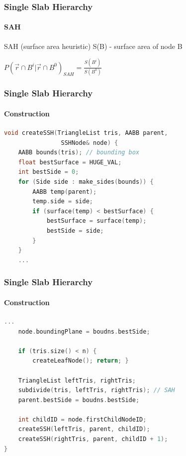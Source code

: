 \documentclass{beamer}
\begin{document}
\begin{frame}
    \frametitle{Single Slab Hierarchy}
    \framesubtitle{SAH}
    \begin{block}{SAH (surface area heuristic)}
        S(B) - surface area of node B

        \(
        P(\overrightarrow{r}\cap B^i \lvert \overrightarrow{r} \cap B^0)_{SAH} = \frac{S(B^i)}{S(B^0)}
        \)
    \end{block}

\end{frame}

\begin{frame}[fragile]
    \frametitle{Single Slab Hierarchy}
    \framesubtitle{Construction}

    \begin{lstlisting}[language=C++,basicstyle=\ttfamily,keywordstyle=\color{red}]
void createSSH(TriangleList tris, AABB parent,
                SSHNode& node) {
    AABB bounds(tris); // bounding box
    float bestSurface = HUGE_VAL;
    int bestSide = 0;
    for (Side side : make_sides(bounds)) {
        AABB temp(parent);
        temp.side = side;
        if (surface(temp) < bestSurface) {
            bestSurface = surface(temp);
            bestSide = side;
        }
    }
    ...

    \end{lstlisting}

\end{frame}

\begin{frame}[fragile]
    \frametitle{Single Slab Hierarchy}
    \framesubtitle{Construction}
    \begin{lstlisting}[language=C++,basicstyle=\ttfamily,keywordstyle=\color{red}]
    ...
    node.boundingPlane = boudns.bestSide;

    if (tris.size() < n) {
        createLeafNode(); return; }

    TriangleList leftTris, rightTris;
    subdivide(tris, leftTris, rightTris); // SAH
    parent.bestSide = boudns.bestSide;

    int childID = node.firstChildNodeID;
    createSSH(leftTris, parent, childID);
    createSSH(rightTris, parent, childID + 1);
}
    \end{lstlisting}
\end{frame}
\end{document}
